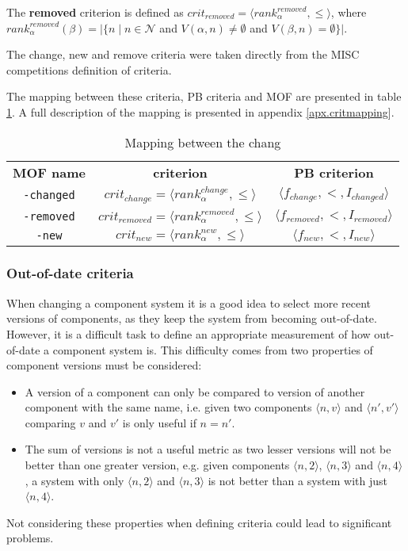 \begin{defs}
	The \textbf{removed} criterion is defined as $crit_{removed} = \langle rank^{removed}_{\alpha}, \leq \rangle$,
	where $rank^{removed}_{\alpha}(\beta) = |\{n \mid n \in \mathcal{N}$ and $V(\alpha,n) \neq \emptyset$ and $V(\beta,n) =\emptyset\}|$.
\end{defs}

The change, new and remove criteria were taken directly from the MISC competitions definition of criteria.

The mapping between these criteria, PB criteria and MOF are presented in table \ref{impl.ccritmapping}.
A full description of the mapping is presented in appendix \ref{apx.critmapping}.
\begin{table}
\begin{tabular}{c | c | c}
\textbf{MOF name} 		& \textbf{\modelname criterion} & \textbf{PB criterion} \\
\texttt{-changed} 	& $crit_{change} = \langle rank^{change}_{\alpha}, \leq \rangle$ & $\langle f_{change}, <, I_{changed} \rangle$ \\
\texttt{-removed} 	& $crit_{removed} = \langle rank^{removed}_{\alpha}, \leq \rangle$ & $\langle f_{removed}, <, I_{removed} \rangle$ \\
\texttt{-new} 	& $crit_{new} = \langle rank^{new}_{\alpha}, \leq \rangle$ & $\langle f_{new}, <, I_{new} \rangle$ \\
\end{tabular}
\caption{Mapping between the chang }
\label{impl.ccritmapping}
\end{table}

\subsubsection{Out-of-date criteria}
When changing a component system it is a good idea to select more recent versions of components, as they keep the system from becoming out-of-date.
However, it is a difficult task to define an appropriate measurement of how out-of-date a component system is.
This difficulty comes from two properties of component versions must be considered:
\begin{itemize}
  \item A version of a component can only be compared to version of another component with the same name, 
  i.e. given two components $\langle n,v \rangle$ and  $\langle n',v' \rangle$ comparing $v$ and $v'$ is only useful if $n = n'$.
  \item The sum of versions is not a useful metric as two lesser versions will not be better than one greater version, 
  e.g. given components $\langle n,2 \rangle$,  $\langle n,3 \rangle$ and  $\langle n,4 \rangle$,
  a system with only $\langle n,2 \rangle$ and $\langle n,3 \rangle$ is not better than a system with just $\langle n,4 \rangle$. 
\end{itemize}
Not considering these properties when defining criteria could lead to significant problems.

